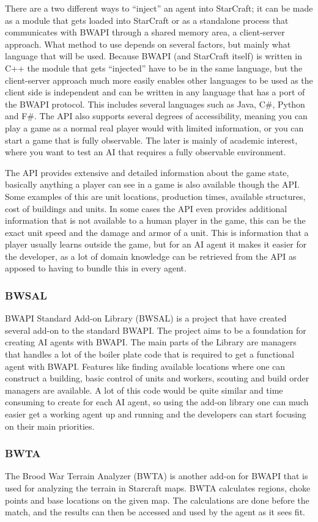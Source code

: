 There are a two different ways to ``inject'' an agent into StarCraft; it can be
made as a module that gets loaded into StarCraft or as a standalone process that
communicates with BWAPI through a shared memory area, a client-server approach.
What method to use depends on several factors, but mainly what language that
will be used. Because BWAPI (and StarCraft itself) is written in C++ the module
that gets ``injected'' have to be in the same language, but the client-server
approach much more easily enables other languages to be used as the client side
is independent and can be written in any language that has a port of the BWAPI
protocol. This includes several languages such as Java, C\#, Python and F\#.
The API also supports several degrees of accessibility, meaning you can play a
game as a normal real player would with limited information, or you can start a
game that is fully observable. The later is mainly of academic interest, where
you want to test an AI that requires a fully observable environment.

The API provides extensive and detailed information about the game state,
basically anything a player can see in a game is also available though the API.
Some examples of this are unit locations, production times, available
structures, cost of buildings and units. In some cases the API even provides
additional information that is not available to a human player in the game, this
can be the exact unit speed and the damage and armor of a unit. This is
information that a player usually learns outside the game, but for an AI agent
it makes it easier for the developer, as a lot of domain knowledge can be
retrieved from the API as apposed to having to bundle this in every agent. 

\subsubsection{BWSAL}
BWAPI Standard Add-on Library (BWSAL)\cite{bwsal} is a project that have created
several add-on to the standard BWAPI. The project aims to be a foundation for
creating AI agents with BWAPI. The main parts of the Library are managers that
handles a lot of the boiler plate code that is required to get a functional
agent with BWAPI. Features like finding available locations where one can
construct a building, basic control of units and workers, scouting and build
order managers are available. A lot of this code would be quite similar and time
consuming to create for each AI agent, so using the add-on library one can much
easier get a working agent up and running and the developers can start focusing
on their main priorities. 

\subsubsection{BWTA}
The Brood War Terrain Analyzer (BWTA)\cite{bwta} is another add-on for BWAPI
that is used for analyzing the terrain in Starcraft maps. BWTA calculates
regions, choke points and base locations on the given map. The calculations are
done before the match, and the results can then be accessed and used by the
agent as it sees fit.  